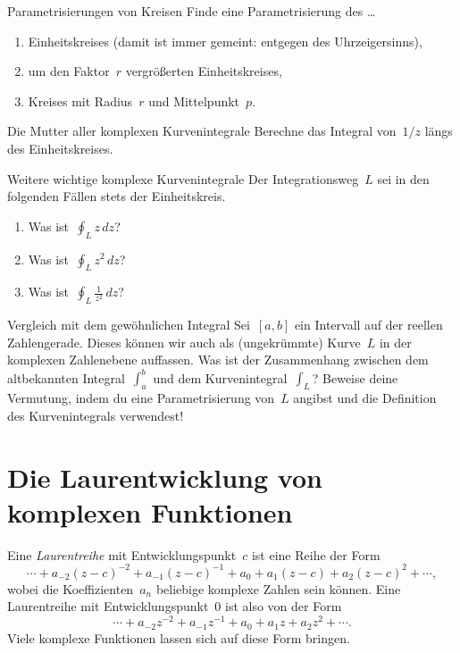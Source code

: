 \documentclass[twoside]{../zirkelblatt1415}
\theoremstyle{definition}
\theoremstyle{plain}
\theoremstyle{remark}
\begin{document}
\begin{aufgabe}{Parametrisierungen von Kreisen}
Finde eine Parametrisierung des \ldots
\begin{enumerate}
\item Einheitskreises (damit ist immer gemeint: entgegen des Uhrzeigersinns),
\item um den Faktor~$r$ vergrößerten Einheitskreises,
\item Kreises mit Radius~$r$ und Mittelpunkt~$p$.
\end{enumerate}
\fixlistspacing
\end{aufgabe}

\begin{aufgabe}{Die Mutter aller komplexen Kurvenintegrale}
Berechne das Integral von~$1/z$ längs des Einheitskreises.
\end{aufgabe}

\begin{aufgabe}{Weitere wichtige komplexe Kurvenintegrale}
Der Integrationsweg~$L$ sei in den folgenden Fällen stets der Einheitskreis.
\begin{enumerate}
\item Was ist~$\oint_L z \,dz$?
\item Was ist~$\oint_L z^2 \,dz$?
\item Was ist~$\oint_L \frac{1}{z^2} \,dz$?
\end{enumerate}
\end{aufgabe}

\begin{aufgabe}{Vergleich mit dem gewöhnlichen Integral}
Sei~$[a,b]$ ein Intervall auf der reellen Zahlengerade. Dieses können wir auch
als (ungekrümmte) Kurve~$L$ in der komplexen Zahlenebene auffassen. Was ist der
Zusammenhang zwischen dem altbekannten Integral~$\int_a^b$ und dem
Kurvenintegral~$\int_L$? Beweise deine Vermutung, indem du eine
Parametrisierung von~$L$ angibst und die Definition des Kurvenintegrals
verwendest!
\end{aufgabe}


\section{Die Laurentwicklung von komplexen Funktionen}

Eine \emph{Laurentreihe} mit Entwicklungspunkt~$c$ ist eine Reihe der Form
\[ \cdots + a_{-2} (z-c)^{-2} + a_{-1} (z-c)^{-1} + a_0 + a_1 (z-c) + a_2 (z-c)^2 + \cdots, \]
wobei die Koeffizienten~$a_n$ beliebige komplexe Zahlen sein können. Eine
Laurentreihe mit Entwicklungspunkt~$0$ ist also von der Form
\[ \cdots + a_{-2} z^{-2} + a_{-1} z^{-1} + a_0 + a_1 z + a_2 z^2 + \cdots. \]
Viele komplexe Funktionen lassen sich auf diese Form bringen.
\end{document}
